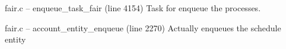 fair.c -- enqueue_task_fair (line 4154)
	Task for enqueue the processes.

fair.c -- account_entity_enqueue (line 2270)
	Actually enqueues the schedule entity
